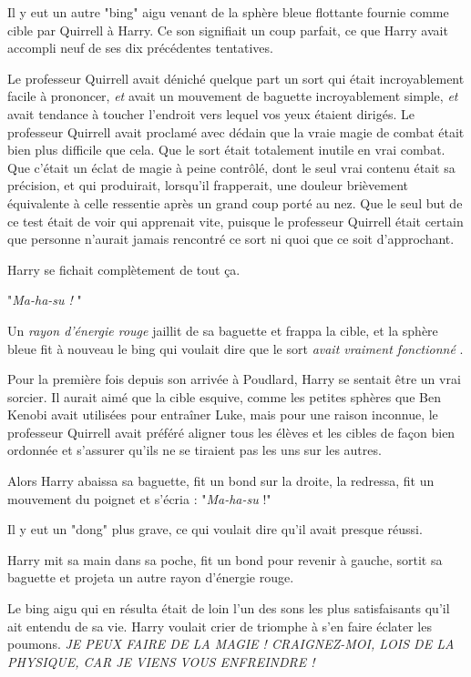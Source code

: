 Il y eut un autre "bing" aigu venant de la sphère bleue flottante fournie comme cible par Quirrell à Harry. Ce son signifiait un coup parfait, ce que Harry avait accompli neuf de ses dix précédentes tentatives.

Le professeur Quirrell avait déniché quelque part un sort qui était incroyablement facile à prononcer, \emph{et}  avait un mouvement de baguette incroyablement simple, \emph{et}  avait tendance à toucher l'endroit vers lequel vos yeux étaient dirigés. Le professeur Quirrell avait proclamé avec dédain que la vraie magie de combat était bien plus difficile que cela. Que le sort était totalement inutile en vrai combat. Que c'était un éclat de magie à peine contrôlé, dont le seul vrai contenu était sa précision, et qui produirait, lorsqu'il frapperait, une douleur brièvement équivalente à celle ressentie après un grand coup porté au nez. Que le seul but de ce test était de voir qui apprenait vite, puisque le professeur Quirrell était certain que personne n'aurait jamais rencontré ce sort ni quoi que ce soit d'approchant.

Harry se fichait complètement de tout ça.

"\emph{Ma-ha-su !} "

Un \emph{rayon d'énergie rouge}  jaillit de sa baguette et frappa la cible, et la sphère bleue fit à nouveau le bing qui voulait dire que le sort \emph{avait vraiment fonctionné} .

Pour la première fois depuis son arrivée à Poudlard, Harry se sentait être un vrai sorcier. Il aurait aimé que la cible esquive, comme les petites sphères que Ben Kenobi avait utilisées pour entraîner Luke, mais pour une raison inconnue, le professeur Quirrell avait préféré aligner tous les élèves et les cibles de façon bien ordonnée et s'assurer qu'ils ne se tiraient pas les uns sur les autres.

Alors Harry abaissa sa baguette, fit un bond sur la droite, la redressa, fit un mouvement du poignet et s'écria : "\emph{Ma-ha-su}  !"

Il y eut un "dong" plus grave, ce qui voulait dire qu'il avait presque réussi.

Harry mit sa main dans sa poche, fit un bond pour revenir à gauche, sortit sa baguette et projeta un autre rayon d'énergie rouge.

Le bing aigu qui en résulta était de loin l'un des sons les plus satisfaisants qu'il ait entendu de sa vie. Harry voulait crier de triomphe à s'en faire éclater les poumons. \emph{JE PEUX FAIRE DE LA MAGIE ! CRAIGNEZ-MOI, LOIS DE LA PHYSIQUE, CAR JE VIENS VOUS ENFREINDRE !} 

